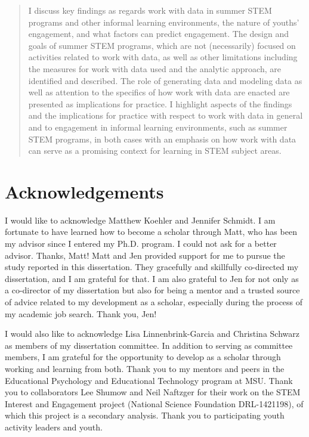 \documentclass[]{msu-thesis}
\theoremstyle{definition}
\theoremstyle{definition}
\theoremstyle{definition}
\theoremstyle{remark}
\begin{document}
\begin{abstract}
I discuss key findings as regards work with data in summer STEM programs and other informal learning environments, the nature of youths' engagement, and what factors can predict engagement. The design and goals of summer STEM programs, which are not (necessarily) focused on activities related to work with data, as well as other limitations including the measures for work with data used and the analytic approach, are identified and described. The role of generating data and modeling data as well as attention to the specifics of how work with data are enacted are presented as implications for practice. I highlight aspects of the findings and the implications for practice with respect to work with data in general and to engagement in informal learning environments, such as summer STEM programs, in both cases with an emphasis on how work with data can serve as a promising context for learning in STEM subject areas.

\end{abstract}

\clearpage

\makecopyrightpage

%
\makededicationpage
%
\clearpage

\chapter*{Acknowledgements}
\DoubleSpacing %
I would like to acknowledge Matthew Koehler and Jennifer Schmidt. I am fortunate to have learned how to become a scholar through Matt, who has been my advisor since I entered my Ph.D. program. I could not ask for a better advisor. Thanks, Matt! Matt and Jen provided support for me to pursue the study reported in this dissertation. They gracefully and skillfully co-directed my dissertation, and I am grateful for that. I am also grateful to Jen for  not only as a co-director of my dissertation but also for being a mentor and a trusted source of advice related to my development as a scholar, especially during the process of my academic job search. Thank you, Jen!

I would also like to acknowledge Lisa Linnenbrink-Garcia and Christina Schwarz as members of my dissertation committee. In addition to serving as committee members, I am grateful for the opportunity to develop as a scholar through working and learning from both. Thank you to my mentors and peers in the Educational Psychology and Educational Technology program at MSU. Thank you to collaborators Lee Shumow and Neil Naftzger for their work on the STEM Interest and Engagement project (National Science Foundation DRL-1421198), of which this project is a secondary analysis. Thank you to participating youth activity leaders and youth.
\end{document}
